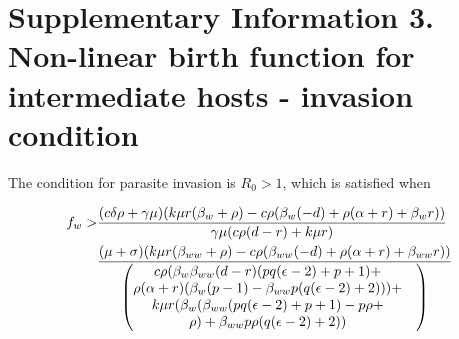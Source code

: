 \documentclass[11pt]{article}
\begin{document}
\section*{Supplementary Information 3. Non-linear birth function for intermediate hosts - invasion condition}

The condition for parasite invasion is $R_0 > 1$, which is satisfied when

\begin{align}
	f_w > & \frac{(c \delta  \rho +\gamma  \mu ) (k \mu  r (\beta_w+\rho )-c \rho  (\beta_w (-d)+\rho  (\alpha +r)+\beta_w r))}{\gamma  \mu  (c \rho  (d-r)+k \mu  r)} \notag \\
	& \frac{(\mu +\sigma ) (k \mu  r (\beta_{ww}+\rho )-c \rho  (\beta_{ww} (-d)+\rho  (\alpha +r)+\beta_{ww} r))}{ \begin{pmatrix} c \rho  (\beta_w \beta_{ww} (d-r) (p q (\epsilon -2)+p+1) + & \\ 
			\rho  (\alpha +r) (\beta_w (p-1)-\beta_{ww} p (q (\epsilon -2)+2))) + & \\
			 k \mu  r (\beta_w (\beta_{ww} (p q (\epsilon -2)+p+1)-p \rho + & \\
			 \rho )+\beta_{ww} p \rho  (q (\epsilon -2)+2)) \end{pmatrix}}
\end{align}
\end{document}
